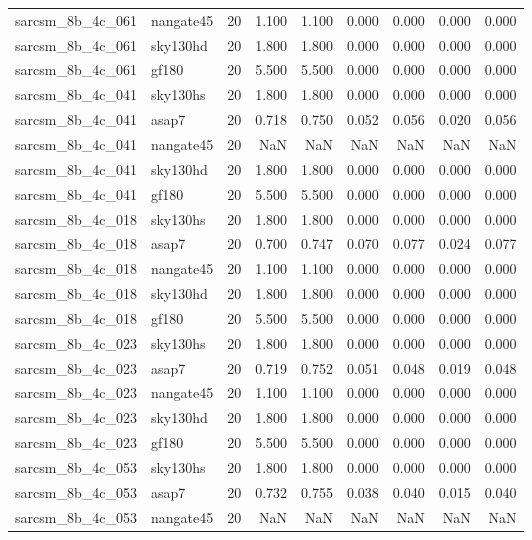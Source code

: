 \begin{tabular}{llrrrrrrr}
sarcsm\_8b\_4c\_061 & nangate45 & 20 & 1.100 & 1.100 & 0.000 & 0.000 & 0.000 & 0.000 \\
sarcsm\_8b\_4c\_061 & sky130hd & 20 & 1.800 & 1.800 & 0.000 & 0.000 & 0.000 & 0.000 \\
sarcsm\_8b\_4c\_061 & gf180 & 20 & 5.500 & 5.500 & 0.000 & 0.000 & 0.000 & 0.000 \\
sarcsm\_8b\_4c\_041 & sky130hs & 20 & 1.800 & 1.800 & 0.000 & 0.000 & 0.000 & 0.000 \\
sarcsm\_8b\_4c\_041 & asap7 & 20 & 0.718 & 0.750 & 0.052 & 0.056 & 0.020 & 0.056 \\
sarcsm\_8b\_4c\_041 & nangate45 & 20 & NaN & NaN & NaN & NaN & NaN & NaN \\
sarcsm\_8b\_4c\_041 & sky130hd & 20 & 1.800 & 1.800 & 0.000 & 0.000 & 0.000 & 0.000 \\
sarcsm\_8b\_4c\_041 & gf180 & 20 & 5.500 & 5.500 & 0.000 & 0.000 & 0.000 & 0.000 \\
sarcsm\_8b\_4c\_018 & sky130hs & 20 & 1.800 & 1.800 & 0.000 & 0.000 & 0.000 & 0.000 \\
sarcsm\_8b\_4c\_018 & asap7 & 20 & 0.700 & 0.747 & 0.070 & 0.077 & 0.024 & 0.077 \\
sarcsm\_8b\_4c\_018 & nangate45 & 20 & 1.100 & 1.100 & 0.000 & 0.000 & 0.000 & 0.000 \\
sarcsm\_8b\_4c\_018 & sky130hd & 20 & 1.800 & 1.800 & 0.000 & 0.000 & 0.000 & 0.000 \\
sarcsm\_8b\_4c\_018 & gf180 & 20 & 5.500 & 5.500 & 0.000 & 0.000 & 0.000 & 0.000 \\
sarcsm\_8b\_4c\_023 & sky130hs & 20 & 1.800 & 1.800 & 0.000 & 0.000 & 0.000 & 0.000 \\
sarcsm\_8b\_4c\_023 & asap7 & 20 & 0.719 & 0.752 & 0.051 & 0.048 & 0.019 & 0.048 \\
sarcsm\_8b\_4c\_023 & nangate45 & 20 & 1.100 & 1.100 & 0.000 & 0.000 & 0.000 & 0.000 \\
sarcsm\_8b\_4c\_023 & sky130hd & 20 & 1.800 & 1.800 & 0.000 & 0.000 & 0.000 & 0.000 \\
sarcsm\_8b\_4c\_023 & gf180 & 20 & 5.500 & 5.500 & 0.000 & 0.000 & 0.000 & 0.000 \\
sarcsm\_8b\_4c\_053 & sky130hs & 20 & 1.800 & 1.800 & 0.000 & 0.000 & 0.000 & 0.000 \\
sarcsm\_8b\_4c\_053 & asap7 & 20 & 0.732 & 0.755 & 0.038 & 0.040 & 0.015 & 0.040 \\
sarcsm\_8b\_4c\_053 & nangate45 & 20 & NaN & NaN & NaN & NaN & NaN & NaN \\

\end{tabular}
